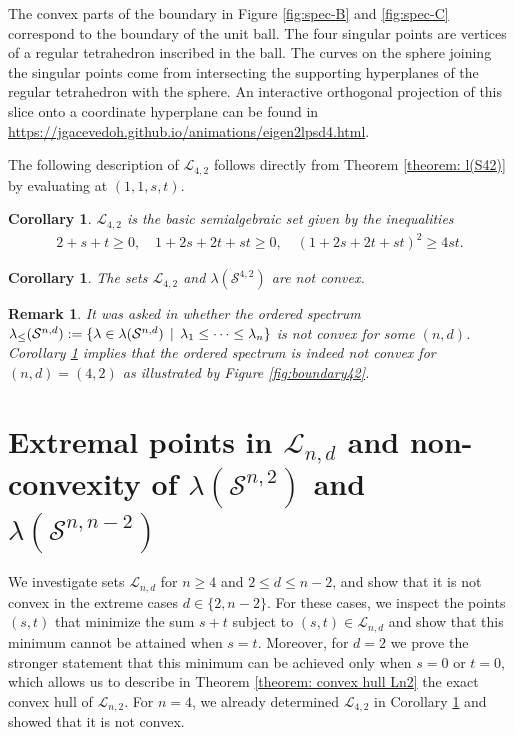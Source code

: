 \documentclass[reqno,hidelinks,11pt]{amsart}
\numberwithin{equation}{section}
\newtheorem{remark}[theorem]{Remark}
\newtheorem{corollary}[theorem]{Corollary}
\def\S{\mathcal{S}}
\newcommand{\suchthat}{\;\ifnum\currentgrouptype=16 \middle\fi|\;}
\begin{document}
The convex parts of the boundary in Figure \ref{fig:spec-B} and \ref{fig:spec-C} correspond to the boundary of the unit ball. The four singular points are vertices of a regular tetrahedron inscribed in the ball. The curves on the sphere joining the singular points come from intersecting the supporting hyperplanes of the regular tetrahedron with the sphere. An interactive orthogonal projection of this slice onto a coordinate hyperplane can be found in \url{https://jgacevedoh.github.io/animations/eigen2lpsd4.html}.

The following description of $\mathcal{L}_{4,2}$ follows directly from Theorem \ref{theorem: l(S42)} by evaluating at $(1,1,s,t)$.

\begin{corollary}\label{cor: L42}
    $\mathcal{L}_{4,2}$ is the basic semialgebraic set given by the inequalities
    \begin{align*}
        2 + s+t\ge 0,\quad
        1+2s+2t+st\ge0,\quad
        (1+2s+2t+st)^2\ge4st.
    \end{align*}
\end{corollary}
\begin{corollary}\label{cor:ordered spectrum}
The sets $\mathcal{L}_{4, 2}$ and $\lambda(\S^{4,2})$ are not convex.
\end{corollary}

\begin{remark}\label{rem:ordered spectrum non-convex}
It was asked in \cite[Section~2]{kozhasov2023eigenvalues} whether the \emph{ordered spectrum} $\lambda_{\leq}(\S^{n,d}) := \{ \lambda \in \lambda(\S^{n,d}) \, \suchthat \, \lambda_1 \leq  \dots  \leq\lambda_n\}$ is not convex for some $(n,d)$. Corollary \ref{cor: L42} implies that the ordered spectrum is indeed not convex for $(n, d) = (4, 2)$ as illustrated by Figure \ref{fig:boundary42}.
\end{remark}

\section{Extremal points in \texorpdfstring{$\mathcal{L}_{n, d}$}{ln,d} and non-convexity of \texorpdfstring{$\lambda(\mathcal{S}^{n,2})$}{lambda(Sn,2)} and \texorpdfstring{$\lambda(\mathcal{S}^{n,n-2})$}{lambda(Sn,n-2)}}\label{section: 2-locally psd-nonconvex}

We investigate sets $\mathcal{L}_{n,d}$ for $n \geq 4$ and $2 \leq d \leq n - 2$, and show that it is not convex in the extreme cases $d \in \{2, n - 2\}$. For these cases, we 
inspect the points $(s,t)$ that minimize the sum $s+t$ subject to $(s,t) \in \mathcal{L}_{n,d}$ and show that this minimum cannot be attained when $s = t$. Moreover, for $d = 2$ we prove the stronger statement that this minimum can be achieved only when $s = 0$ or $t = 0$, which allows us to describe in Theorem \ref{theorem: convex hull Ln2} the exact convex hull of $\mathcal{L}_{n,2}$. For $n = 4$, we already determined $\mathcal{L}_{4, 2}$ in Corollary \ref{cor: L42} and showed that it is not convex. 
\end{document}
